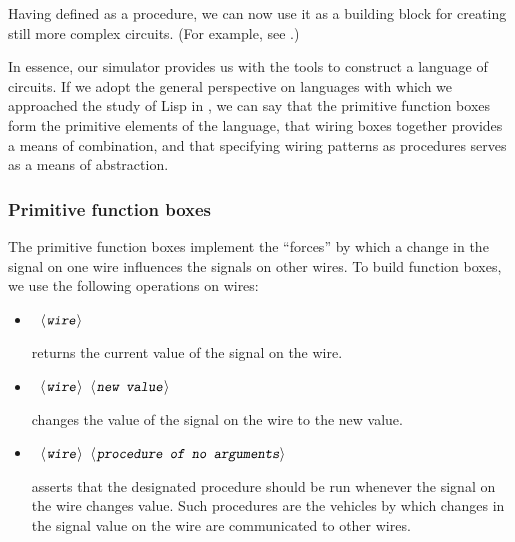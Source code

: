 \noindent
Having defined  as a procedure, we can now use it as a
building block for creating still more complex circuits.  (For example, see
.)

In essence, our simulator provides us with the tools to construct a language of
circuits.  If we adopt the general perspective on languages with which we
approached the study of Lisp in , we can say that the
primitive function boxes form the primitive elements of the language, that
wiring boxes together provides a means of combination, and that specifying
wiring patterns as procedures serves as a means of abstraction.

\subsubsection*{Primitive function boxes}

The primitive function boxes implement the ``forces'' by which a change in the
signal on one wire influences the signals on other wires.  To build function
boxes, we use the following operations on wires:

\begin{itemize}

\item {}\( \;\;\langle\kern0.06em\hbox{\ttfamily\slshape wire}\kern0.08em\rangle \)\code{)}

\noindent
returns the current value of the signal on the wire.

\item {}\( \;\;\langle\kern0.08em\hbox{\ttfamily\slshape wire}\kern0.08em\rangle\;\;\langle\kern0.08em\hbox{\ttfamily\slshape new value}\kern0.08em\rangle \)\code{)}

\noindent
changes the value of the signal on the wire to the new value.

\item {}\( \;\;\langle\kern0.08em\hbox{\ttfamily\slshape wire}\kern0.08em\rangle\;\;\langle\kern0.08em\hbox{\ttfamily\slshape procedure of no arguments}\kern0.02em\rangle \)\code{)}

\noindent
asserts that the designated procedure should be run whenever the signal on the
wire changes value.  Such procedures are the vehicles by which changes in the
signal value on the wire are communicated to other wires.

\end{itemize}

